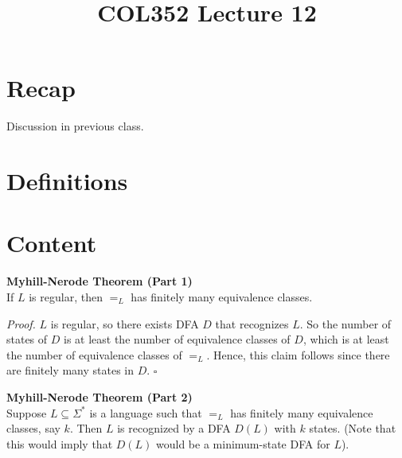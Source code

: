 \documentclass[a4paper]{article}
\title{\textbf{COL352 Lecture 12}}
\date{}
\newenvironment{proof}{\begin{breakbox}\textit{Proof.}}{\hfill$\square$\end{breakbox}}
\newcommand{\nl}{\vspace{0.2cm}\\}
\begin{document}
\maketitle
\tableofcontents

\section{Recap}

Discussion in previous class.

\section{Definitions}

\section{Content}

\begin{theorem}
    \textbf{Myhill-Nerode Theorem (Part 1)}\nl
    If $L$ is regular, then $=_L$ has finitely many equivalence classes.
\end{theorem}

\begin{proof}
    $L$ is regular, so there exists DFA $D$ that recognizes $L$. So the number of states of $D$ is at least the number of equivalence classes of $D$, which is at least the number of
    equivalence classes of $=_L$. Hence, this claim follows since there are finitely many states in $D$.
\end{proof}

\begin{theorem}
    \textbf{Myhill-Nerode Theorem (Part 2)}\nl
    Suppose $L \subseteq \Sigma^*$ is a language such that $=_L$ has finitely many equivalence classes, say $k$. Then $L$ is recognized by a DFA $D(L)$ with $k$ states. 
    (Note that this would imply that $D(L)$ would be a minimum-state DFA for $L$).
\end{theorem}
\end{document}
